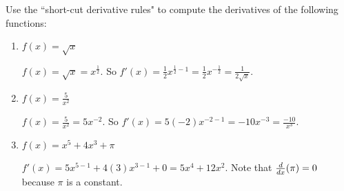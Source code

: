 \documentclass[handout,nooutcomes]{ximera}
\begin{document}
\begin{problem}
Use the ``short-cut derivative rules" to compute the derivatives of the following functions:
	
	\begin{enumerate}
	
	\item $f(x) = \sqrt{x}$
	
		\begin{freeResponse}
		$f(x) = \sqrt{x} = x^{\frac{1}{2}}.$  So $f'(x) = \frac{1}{2} x^{\frac{1}{2} - 1} = \frac{1}{2} x^{-\frac{1}{2}} = \frac{1}{2\sqrt{x}}$.
		\end{freeResponse}
			
			
	
	\item $f(x) = \frac{5}{x^2}$
	
		\begin{freeResponse}
		$f(x) = \frac{5}{x^2} = 5x^{-2}.$  So $f'(x) = 5(-2) x^{-2-1} = -10x^{-3} = \frac{-10}{x^3}$.  
		\end{freeResponse}
			
			
	
	\item $f(x) = x^5 + 4x^3 + \pi $
	
		\begin{freeResponse}
		$f'(x) = 5x^{5-1} + 4(3)x^{3-1} + 0 = 5x^4 + 12x^2$.  Note that $\frac{d}{dx} (\pi) = 0$ because $\pi$ is a constant.	
		\end{freeResponse}
			
			
	
	\end{enumerate}
\end{problem}
\end{document}
